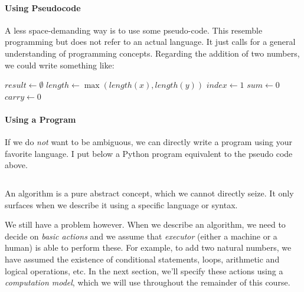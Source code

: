 \documentclass {aldast}
\begin{document}
\paragraph{Using Pseudocode} A less space-demanding way is to use some
pseudo-code. This resemble programming but does not refer to an
actual language. It just calls for a general understanding of
programming concepts. Regarding the addition of two numbers, we could
write something like:

\begin{algorithm}
  $result \gets \emptyset$\;
  $length \gets \max(length(x), length(y))$\;
  $index \gets 1$\;
  $sum \gets 0$\;
  $carry \gets 0$\;
\end{algorithm}

\paragraph{Using a Program} If we do \emph{not} want to be ambiguous,
we can directly write a program using your favorite language. I
put below a Python program equivalent to the pseudo code
above.

\inputminted{python}{code/sum.py}

\begin{takeaway}
  An algorithm is a pure abstract concept, which we cannot directly
  seize. It only surfaces when we describe it using a specific language
  or syntax.
\end{takeaway}

We still have a problem however. When we describe an algorithm, we
need to decide on \emph{basic actions} and we assume that
\emph{executor} (either a machine or a human) is able to perform
these. For example, to add two natural numbers, we have assumed the
existence of conditional statements, loops, arithmetic and logical
operations, etc. In the next section, we'll specify these actions using a
\emph{computation model}, which we will use throughout the remainder
of this course.
\end{document}

